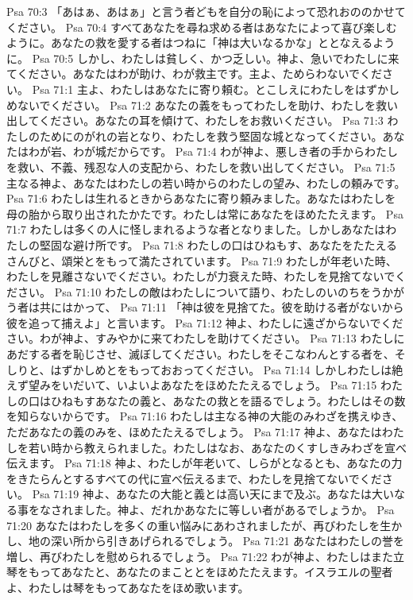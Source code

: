 Psa 70:3  「あはぁ、あはぁ」と言う者どもを自分の恥によって恐れおののかせてください。
Psa 70:4  すべてあなたを尋ね求める者はあなたによって喜び楽しむように。あなたの救を愛する者はつねに「神は大いなるかな」ととなえるように。
Psa 70:5  しかし、わたしは貧しく、かつ乏しい。神よ、急いでわたしに来てください。あなたはわが助け、わが救主です。主よ、ためらわないでください。
Psa 71:1  主よ、わたしはあなたに寄り頼む。とこしえにわたしをはずかしめないでください。
Psa 71:2  あなたの義をもってわたしを助け、わたしを救い出してください。あなたの耳を傾けて、わたしをお救いください。
Psa 71:3  わたしのためにのがれの岩となり、わたしを救う堅固な城となってください。あなたはわが岩、わが城だからです。
Psa 71:4  わが神よ、悪しき者の手からわたしを救い、不義、残忍な人の支配から、わたしを救い出してください。
Psa 71:5  主なる神よ、あなたはわたしの若い時からのわたしの望み、わたしの頼みです。
Psa 71:6  わたしは生れるときからあなたに寄り頼みました。あなたはわたしを母の胎から取り出されたかたです。わたしは常にあなたをほめたたえます。
Psa 71:7  わたしは多くの人に怪しまれるような者となりました。しかしあなたはわたしの堅固な避け所です。
Psa 71:8  わたしの口はひねもす、あなたをたたえるさんびと、頌栄とをもって満たされています。
Psa 71:9  わたしが年老いた時、わたしを見離さないでください。わたしが力衰えた時、わたしを見捨てないでください。
Psa 71:10  わたしの敵はわたしについて語り、わたしのいのちをうかがう者は共にはかって、
Psa 71:11  「神は彼を見捨てた。彼を助ける者がないから彼を追って捕えよ」と言います。
Psa 71:12  神よ、わたしに遠ざからないでください。わが神よ、すみやかに来てわたしを助けてください。
Psa 71:13  わたしにあだする者を恥じさせ、滅ぼしてください。わたしをそこなわんとする者を、そしりと、はずかしめとをもっておおってください。
Psa 71:14  しかしわたしは絶えず望みをいだいて、いよいよあなたをほめたたえるでしょう。
Psa 71:15  わたしの口はひねもすあなたの義と、あなたの救とを語るでしょう。わたしはその数を知らないからです。
Psa 71:16  わたしは主なる神の大能のみわざを携えゆき、ただあなたの義のみを、ほめたたえるでしょう。
Psa 71:17  神よ、あなたはわたしを若い時から教えられました。わたしはなお、あなたのくすしきみわざを宣べ伝えます。
Psa 71:18  神よ、わたしが年老いて、しらがとなるとも、あなたの力をきたらんとするすべての代に宣べ伝えるまで、わたしを見捨てないでください。
Psa 71:19  神よ、あなたの大能と義とは高い天にまで及ぶ。あなたは大いなる事をなされました。神よ、だれかあなたに等しい者があるでしょうか。
Psa 71:20  あなたはわたしを多くの重い悩みにあわされましたが、再びわたしを生かし、地の深い所から引きあげられるでしょう。
Psa 71:21  あなたはわたしの誉を増し、再びわたしを慰められるでしょう。
Psa 71:22  わが神よ、わたしはまた立琴をもってあなたと、あなたのまこととをほめたたえます。イスラエルの聖者よ、わたしは琴をもってあなたをほめ歌います。
